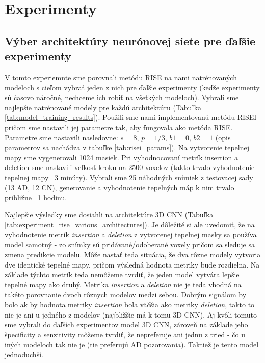 \section{Experimenty}

\subsection{Výber architektúry neurónovej siete pre ďaľšie experimenty \label{sec:experiment_rise_various_architectures}}

V tomto experiemnte sme porovnali metódu RISE na nami natrénovaných modeloch s cieľom vybrať jeden z nich pre ďaľšie experimenty (keďže experimenty sú časovo náročné, nechceme ich robiť na všetkých modeloch). Vybrali sme najlepšie natrénované modely pre každú architektúru (Tabuľka \ref{tab:model_training_results}). Použili sme nami implementovanú metódu RISEI pričom sme nastavili jej parametre tak, aby fungovala ako metóda RISE.
Parametre sme nastavili nasledovne: $s = 8$, $p = 1/3$, $b1 = 0$, $b2 = 1$ (opis parametrov sa nachádza v tabuľke \ref{tab:risei_params}). Na vytvorenie tepelnej mapy sme vygenerovali 1024 masiek. Pri vyhodnocovaní metrík insertion a deletion sme nastavili veľkosť kroku na 2500 voxelov (takto trvalo vyhodnotenie tepelnej mapy ~3 minúty). Vybrali sme 25 náhodných snímiek z testovacej sady (13 AD, 12 CN), generovanie a vyhodnotenie tepelných máp k nim trvalo približne ~1 hodinu. 

Najlepšie výsledky sme dosiahli na architektúre 3D CNN (Tabuľka \ref{tab:experiment_rise_various_architectures}). Je dôležité si ale uvedomiť, že na vyhodnotenie metrík \textit{insertion} a \textit{deletion} z vytvorenej tepelnej masky sa používa model samotný - zo snímky sú pridávané/odoberané voxely pričom sa sleduje sa zmena predikcie modelu. Môže nastať teda situácia, že dva rôzne modely vytvoria dve identické tepelné mapy, pričom výsledná hodnota metriky bude rozdielna. Na základe týchto metrík teda nemôžeme tvrdiť, že jeden model vytvára lepšie tepelné mapy ako druhý. Metrika \textit{insertion} a \textit{deletion} nie je teda vhodná na takéto porovnanie dvoch rôznych modelov medzi sebou.
Dobrým signálom by bolo ak by hodnota metriky \textit{insertion} bola väčšia ako metriky \textit{deletion}, takto to nie je ani u jedného z modelov (najbližšie má k tomu 3D CNN). Aj kvôli tomuto sme vybrali do ďaľších experimentov model 3D CNN, zároveň na základe jeho špecificity a senzitivity môžeme tvrdiť, že nepreferuje ani jednu z tried - čo u iných modeloch tak nie je (tie preferujú AD pozorovania). Taktiež je tento model jednoduchší.


